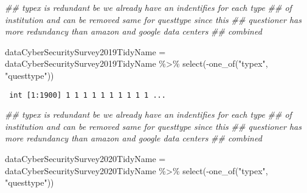\documentclass[
  a4paper,
  DIV=11,
  numbers=noendperiod]{scrartcl}
\newenvironment{Shaded}{\begin{snugshade}}{\end{snugshade}}
\newcommand{\AttributeTok}[1]{\textcolor[rgb]{0.40,0.45,0.13}{#1}}
\newcommand{\DocumentationTok}[1]{\textcolor[rgb]{0.37,0.37,0.37}{\textit{#1}}}
\newcommand{\FunctionTok}[1]{\textcolor[rgb]{0.28,0.35,0.67}{#1}}
\newcommand{\NormalTok}[1]{\textcolor[rgb]{0.00,0.23,0.31}{#1}}
\newcommand{\OtherTok}[1]{\textcolor[rgb]{0.00,0.23,0.31}{#1}}
\newcommand{\SpecialCharTok}[1]{\textcolor[rgb]{0.37,0.37,0.37}{#1}}
\newcommand{\StringTok}[1]{\textcolor[rgb]{0.13,0.47,0.30}{#1}}
\begin{document}
\begin{Shaded}
\begin{Highlighting}[]
\DocumentationTok{\#\# typex is redundant be we already have an indentifies for each type}
\DocumentationTok{\#\# of institution and can be removed same for questtype since this}
\DocumentationTok{\#\# questioner has more redundancy than amazon and google data centers}
\DocumentationTok{\#\# combined}

\NormalTok{dataCyberSecuritySurvey2019TidyName }\OtherTok{=}\NormalTok{ dataCyberSecuritySurvey2019TidyName }\SpecialCharTok{\%\textgreater{}\%}
    \FunctionTok{select}\NormalTok{(}\SpecialCharTok{{-}}\FunctionTok{one\_of}\NormalTok{(}\StringTok{"typex"}\NormalTok{, }\StringTok{"questtype"}\NormalTok{))}
\end{Highlighting}
\end{Shaded}

\begin{Shaded}
\end{Shaded}

\begin{verbatim}
 int [1:1900] 1 1 1 1 1 1 1 1 1 1 ...
\end{verbatim}

\begin{Shaded}
\begin{Highlighting}[]
\DocumentationTok{\#\# typex is redundant be we already have an indentifies for each type}
\DocumentationTok{\#\# of institution and can be removed same for questtype since this}
\DocumentationTok{\#\# questioner has more redundancy than amazon and google data centers}
\DocumentationTok{\#\# combined}

\NormalTok{dataCyberSecuritySurvey2020TidyName }\OtherTok{=}\NormalTok{ dataCyberSecuritySurvey2020TidyName }\SpecialCharTok{\%\textgreater{}\%}
    \FunctionTok{select}\NormalTok{(}\SpecialCharTok{{-}}\FunctionTok{one\_of}\NormalTok{(}\StringTok{"typex"}\NormalTok{, }\StringTok{"questtype"}\NormalTok{))}
\end{Highlighting}
\end{Shaded}
\end{document}
